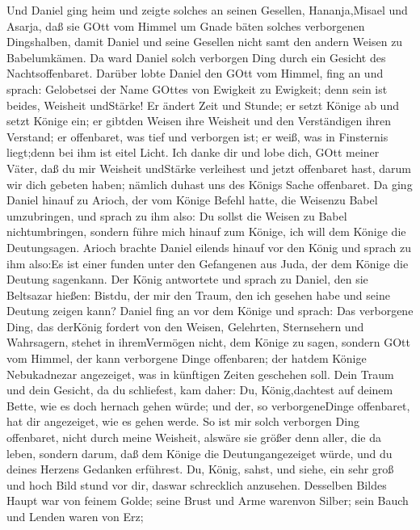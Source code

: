 Und Daniel ging heim und zeigte solches an seinen Gesellen,
Hananja,Misael und Asarja,  daß sie GOtt vom Himmel um
Gnade bäten solches verborgenen Dingshalben, damit Daniel und seine
Gesellen nicht samt den andern Weisen zu Babelumkämen.  Da
ward Daniel solch verborgen Ding durch ein Gesicht des Nachtsoffenbaret.
 Darüber lobte Daniel den GOtt vom Himmel, fing an und
sprach: Gelobetsei der Name GOttes von Ewigkeit zu Ewigkeit; denn sein
ist beides, Weisheit undStärke!  Er ändert Zeit und Stunde;
er setzt Könige ab und setzt Könige ein; er gibtden Weisen ihre Weisheit
und den Verständigen ihren Verstand;  er offenbaret, was
tief und verborgen ist; er weiß, was in Finsternis liegt;denn bei ihm
ist eitel Licht.  Ich danke dir und lobe dich, GOtt meiner
Väter, daß du mir Weisheit undStärke verleihest und jetzt offenbaret
hast, darum wir dich gebeten haben; nämlich duhast uns des Königs Sache
offenbaret.  Da ging Daniel hinauf zu Arioch, der vom
Könige Befehl hatte, die Weisenzu Babel umzubringen, und sprach zu ihm
also: Du sollst die Weisen zu Babel nichtumbringen, sondern führe mich
hinauf zum Könige, ich will dem Könige die Deutungsagen. 
Arioch brachte Daniel eilends hinauf vor den König und sprach zu ihm
also:Es ist einer funden unter den Gefangenen aus Juda, der dem Könige
die Deutung sagenkann.  Der König antwortete und sprach zu
Daniel, den sie Beltsazar hießen: Bistdu, der mir den Traum, den ich
gesehen habe und seine Deutung zeigen kann?  Daniel fing an
vor dem Könige und sprach: Das verborgene Ding, das derKönig fordert von
den Weisen, Gelehrten, Sternsehern und Wahrsagern, stehet in
ihremVermögen nicht, dem Könige zu sagen,  sondern GOtt vom
Himmel, der kann verborgene Dinge offenbaren; der hatdem Könige
Nebukadnezar angezeiget, was in künftigen Zeiten geschehen soll.
 Dein Traum und dein Gesicht, da du schliefest, kam daher:
Du, König,dachtest auf deinem Bette, wie es doch hernach gehen würde;
und der, so verborgeneDinge offenbaret, hat dir angezeiget, wie es gehen
werde.  So ist mir solch verborgen Ding offenbaret, nicht
durch meine Weisheit, alswäre sie größer denn aller, die da leben,
sondern darum, daß dem Könige die Deutungangezeiget würde, und du deines
Herzens Gedanken erführest.  Du, König, sahst, und siehe,
ein sehr groß und hoch Bild stund vor dir, daswar schrecklich anzusehen.
 Desselben Bildes Haupt war von feinem Golde; seine Brust
und Arme warenvon Silber; sein Bauch und Lenden waren von Erz;
